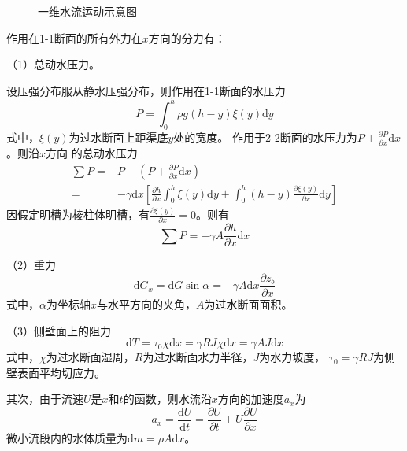 \begin{figure}[htb]
  \centering
\caption{一维水流运动示意图}
\label{FgCGe_1DSwe_Force}
\end{figure}


作用在1-1断面的所有外力在$x$方向的分力有：

（1）总动水压力。

设压强分布服从静水压强分布，则作用在1-1断面的水压力
\begin{equation}
  P
  =
  \int_{0}^{h}\! \rho g(h-y)\xi(y)\mathrm{d}y
\end{equation}
式中，$\xi(y)$为过水断面上距渠底$y$处的宽度。
作用于2-2断面的水压力为$P+\frac{\partial P}{\partial x}\mathrm{d}x$。则沿$x$方向
的总动水压力
\begin{equation}
  \begin{aligned}
    \sum P
    =&
    P - \left(P+\frac {\partial P} {\partial x}\mathrm{d}x\right)
    \\
    =&
    -\gamma \mathrm{d}x
    \left[
      \frac{\partial h}{\partial x}
      \int_{0}^{h}\!
      \xi(y)
      \mathrm{d}y
      +
      \int_{0}^{h}\!
      (h-y)
      \frac{\partial \xi(y)}{\partial x}
      \mathrm{d}y
    \right]
  \end{aligned}
  \label{EqCGe_SVe_Me_Pressure}
\end{equation}
因假定明槽为棱柱体明槽，有$\frac{\partial \xi(y)}{\partial x}=0$。则有
\begin{equation}
  \sum P
  =
  -\gamma A\frac{\partial h}{\partial x}\mathrm{d}x
\end{equation}

（2）重力
\begin{equation}
  \mathrm{d}G_{x}
  =
  \mathrm{d}G\sin\alpha
  =
  -\gamma A\mathrm{d}x\frac{\partial z_{b}}{\partial x}
\end{equation}
式中，$\alpha$为坐标轴$x$与水平方向的夹角，$A$为过水断面面积。

（3）侧壁面上的阻力
\begin{equation}
  \mathrm{d}T
  =
  \tau_{0}\chi\mathrm{d}x
  =
  \gamma RJ\chi\mathrm{d}x
  =
  \gamma AJ\mathrm{d}x
\end{equation}
式中，$\chi$为过水断面湿周，$R$为过水断面水力半径，$J$为水力坡度，
$\tau_{0}=\gamma RJ$为侧壁表面平均切应力。

其次，由于流速$U$是$x$和$t$的函数，则水流沿$x$方向的加速度$a_{x}$为
\begin{equation}
  a_{x}
  =
  \frac{\mathrm{d} U}{\mathrm{d} t}
  =
  \frac{\partial U}{\partial t}
  +
  U
  \frac{\partial U}{\partial x}
\end{equation}
微小流段内的水体质量为$\mathrm{d}m=\rho A\mathrm{d}x$。

